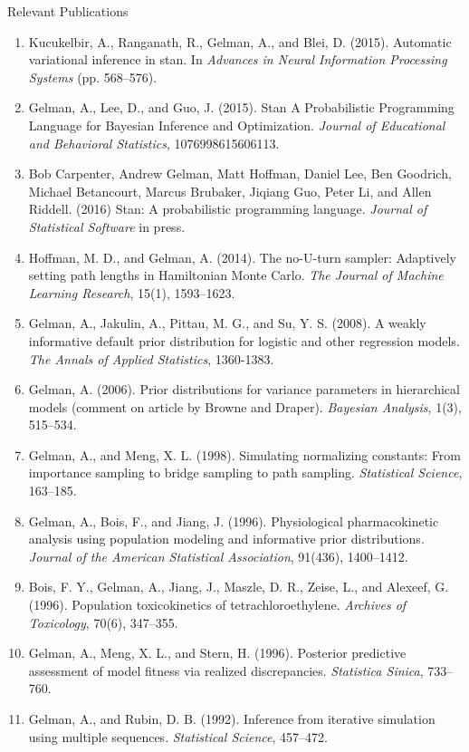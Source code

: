 \noindent
{\sc Relevant Publications}
\vspace*{-3pt}
\begin{enumerate}
\item Kucukelbir, A., Ranganath, R., Gelman, A., and Blei,
  D. (2015). Automatic variational inference in stan. In {\it Advances in
  Neural Information Processing Systems} (pp. 568--576).
\item Gelman, A., Lee, D., and Guo, J. (2015). Stan A Probabilistic
  Programming Language for Bayesian Inference and Optimization. {\it
    Journal of Educational and Behavioral Statistics},
  1076998615606113.
\item Bob Carpenter, Andrew Gelman, Matt Hoffman, Daniel Lee, Ben
  Goodrich, Michael Betancourt, Marcus Brubaker, Jiqiang Guo, Peter
  Li, and Allen Riddell. (2016) Stan: A probabilistic programming
  language.  {\it Journal of Statistical Software} in press.
\item Hoffman, M. D., and Gelman, A. (2014). The no-U-turn sampler:
  Adaptively setting path lengths in Hamiltonian Monte Carlo. {\it The
    Journal of Machine Learning Research}, 15(1), 1593--1623.
\item Gelman, A., Jakulin, A., Pittau, M. G., and Su, Y. S. (2008). A
  weakly informative default prior distribution for logistic and other
  regression models. {\it The Annals of Applied Statistics}, 1360-1383.
\item Gelman, A. (2006). Prior distributions for variance parameters
  in hierarchical models (comment on article by Browne and
  Draper). {\it Bayesian Analysis}, 1(3), 515--534.
\item Gelman, A., and Meng, X. L. (1998). Simulating normalizing
  constants: From importance sampling to bridge sampling to path
  sampling. {\it Statistical Science}, 163--185.
\item Gelman, A., Bois, F., and Jiang, J. (1996). Physiological
  pharmacokinetic analysis using population modeling and informative
  prior distributions. {\it Journal of the American Statistical
    Association}, 91(436), 1400--1412.
\item Bois, F. Y., Gelman, A., Jiang, J., Maszle, D. R., Zeise, L.,
  and Alexeef, G. (1996). Population toxicokinetics of
  tetrachloroethylene. {\it Archives of Toxicology}, 70(6), 347--355.
\item Gelman, A., Meng, X. L., and Stern, H. (1996). Posterior predictive
assessment of model fitness via realized discrepancies. {\it Statistica
Sinica}, 733--760.
\item Gelman, A., and Rubin, D. B. (1992). Inference from iterative
  simulation using multiple sequences. {\it Statistical Science},
  457--472.
\end{enumerate}

